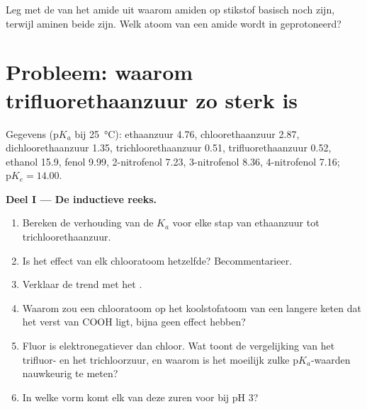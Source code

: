 \begin{exercise}[$\star\star\star$]\label{exo:b1:electronic-effects:12}
Leg met de  van het amide uit waarom amiden op
stikstof basisch noch  zijn, terwijl aminen beide zijn. Welk
atoom van een amide wordt in  geprotoneerd?
\end{exercise}

\section{Probleem: waarom trifluorethaanzuur zo sterk is}

\begin{problem}
\label{pb:b1:electronic-effects:1}
Gegevens ($\mathrm{p}K_a$ bij \qty{25}{\celsius}): ethaanzuur 4.76,
chloorethaanzuur 2.87, dichloorethaanzuur 1.35, trichloorethaanzuur 0.51,
trifluorethaanzuur 0.52, ethanol 15.9, fenol 9.99, 2-nitrofenol 7.23,
3-nitrofenol 8.36, 4-nitrofenol 7.16; $\mathrm{p}K_e = 14.00$.

\medskip
\noindent\textbf{Deel I --- De inductieve reeks.}
\begin{enumerate}
  \item Bereken de verhouding van de $K_a$ voor elke stap van ethaanzuur
        tot trichloorethaanzuur.
  \item Is het effect van elk chlooratoom hetzelfde? Becommentarieer.
  \item Verklaar de trend met het .
  \item Waarom zou een chlooratoom op het koolstofatoom van een langere
        keten dat het verst van COOH ligt, bijna geen effect hebben?
  \item Fluor is elektronegatiever dan chloor. Wat toont de vergelijking
        van het trifluor- en het trichloorzuur, en waarom is het moeilijk
        zulke $\mathrm{p}K_a$-waarden nauwkeurig te meten?
  \item In welke vorm komt elk van deze zuren voor bij pH 3?
\end{enumerate}


\end{problem}
